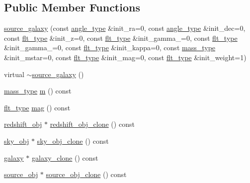 \subsection*{Public Member Functions}
\begin{DoxyCompactItemize}
\item 
\hyperlink{classIceBRG_1_1source__galaxy_a4c686c1b8886eeb4a63159e2e8f78c24}{source\-\_\-galaxy} (const \hyperlink{namespaceIceBRG_a688eeb0811a2474b20b667ed2e9625a1}{angle\-\_\-type} \&init\-\_\-ra=0, const \hyperlink{namespaceIceBRG_a688eeb0811a2474b20b667ed2e9625a1}{angle\-\_\-type} \&init\-\_\-dec=0, const \hyperlink{lib_2IceBRG__main_2common_8h_ad0f130a56eeb944d9ef2692ee881ecc4}{flt\-\_\-type} \&init\-\_\-z=0, const \hyperlink{lib_2IceBRG__main_2common_8h_ad0f130a56eeb944d9ef2692ee881ecc4}{flt\-\_\-type} \&init\-\_\-gamma\-\_=0, const \hyperlink{lib_2IceBRG__main_2common_8h_ad0f130a56eeb944d9ef2692ee881ecc4}{flt\-\_\-type} \&init\-\_\-gamma\-\_=0, const \hyperlink{lib_2IceBRG__main_2common_8h_ad0f130a56eeb944d9ef2692ee881ecc4}{flt\-\_\-type} \&init\-\_\-kappa=0, const \hyperlink{namespaceIceBRG_a1be72ac4918a9b029f2eefa084213e35}{mass\-\_\-type} \&init\-\_\-mstar=0, const \hyperlink{lib_2IceBRG__main_2common_8h_ad0f130a56eeb944d9ef2692ee881ecc4}{flt\-\_\-type} \&init\-\_\-mag=0, const \hyperlink{lib_2IceBRG__main_2common_8h_ad0f130a56eeb944d9ef2692ee881ecc4}{flt\-\_\-type} \&init\-\_\-weight=1)
\item 
virtual \hyperlink{classIceBRG_1_1source__galaxy_a7da38db1eff5abdf349cf6eef319d93a}{$\sim$source\-\_\-galaxy} ()
\item 
\hyperlink{namespaceIceBRG_a1be72ac4918a9b029f2eefa084213e35}{mass\-\_\-type} \hyperlink{classIceBRG_1_1source__galaxy_a2892608eb586559a48b0c37702220f31}{m} () const 
\item 
\hyperlink{lib_2IceBRG__main_2common_8h_ad0f130a56eeb944d9ef2692ee881ecc4}{flt\-\_\-type} \hyperlink{classIceBRG_1_1source__galaxy_a33f22908e54b33a8a28603e1ddddd45d}{mag} () const 
\item 
\hyperlink{classIceBRG_1_1redshift__obj}{redshift\-\_\-obj} $\ast$ \hyperlink{classIceBRG_1_1source__galaxy_a59d08611112a2118f49ce569271524e7}{redshift\-\_\-obj\-\_\-clone} () const 
\item 
\hyperlink{classIceBRG_1_1sky__obj}{sky\-\_\-obj} $\ast$ \hyperlink{classIceBRG_1_1source__galaxy_abf946b4f026c3ff45bfd4909a34bbbd7}{sky\-\_\-obj\-\_\-clone} () const 
\item 
\hyperlink{classIceBRG_1_1galaxy}{galaxy} $\ast$ \hyperlink{classIceBRG_1_1source__galaxy_acd7fb2dea893e8f22e85f5e228b9aaba}{galaxy\-\_\-clone} () const 
\item 
\hyperlink{classIceBRG_1_1source__obj}{source\-\_\-obj} $\ast$ \hyperlink{classIceBRG_1_1source__galaxy_af44074baa972ef3d0ebc59aedd047459}{source\-\_\-obj\-\_\-clone} () const 
\end{DoxyCompactItemize}
